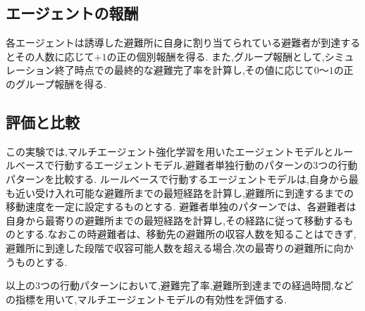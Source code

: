 \subsection{エージェントの報酬}
各エージェントは誘導した避難所に自身に割り当てられている避難者が到達するとその人数に応じて$+1$の正の個別報酬を得る.
また,グループ報酬として,シミュレーション終了時点での最終的な避難完了率を計算し,その値に応じて$0$～$1$の正のグループ報酬を得る.

\subsection{評価と比較}
この実験では,マルチエージェント強化学習を用いたエージェントモデルとルールベースで行動するエージェントモデル,避難者単独行動のパターンの3つの行動パターンを比較する.
ルールベースで行動するエージェントモデルは,自身から最も近い受け入れ可能な避難所までの最短経路を計算し,避難所に到達するまでの移動速度を一定に設定するものとする.
避難者単独のパターンでは、各避難者は自身から最寄りの避難所までの最短経路を計算し,その経路に従って移動するものとする.なおこの時避難者は、移動先の避難所の収容人数を知ることはできず,避難所に到達した段階で収容可能人数を超える場合,次の最寄りの避難所に向かうものとする.\par

以上の3つの行動パターンにおいて,避難完了率,避難所到達までの経過時間,などの指標を用いて,マルチエージェントモデルの有効性を評価する.